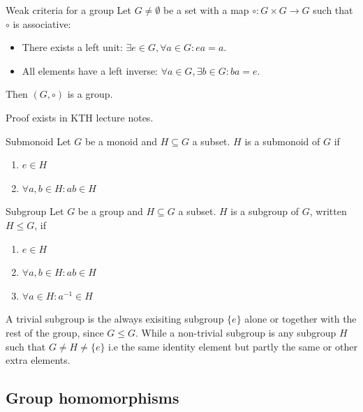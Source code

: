 \documentclass[a4paper]{article}
\begin{document}
\begin{ther}{Weak criteria for a group}
Let $G \neq \emptyset$ be a set with a map $\circ : G \times G \to G$ such that $\circ$ is associative:
\begin{itemize}
    \item There exists a left unit: $\exists e \in G, \forall a \in G : ea = a$.
    \item All elements have a left inverse: $\forall a \in G, \exists b \in G : ba = e$.
\end{itemize}
Then $(G, \circ)$ is a group.
\end{ther}
\begin{add}
    Proof exists in KTH lecture notes.
\end{add}

\begin{defi}{Submonoid}
Let $G$ be a monoid and $H \subseteq G$ a subset. $H$ is a submonoid of $G$ if 
\begin{enumerate}[label=(\roman*)]
    \item $e \in H$
    \item $\forall a,b \in H : ab \in H$
\end{enumerate}
\end{defi}

\begin{defi}{Subgroup}
Let $G$ be a group and $H \subseteq G$ a subset. $H$ is a subgroup of $G$, written $H \le G$, if 
\begin{enumerate}[label=(\roman*)]
    \item $e \in H$ 
    \item $\forall a,b \in H : ab \in H$ 
    \item $\forall a \in H : a^{-1} \in H$ 
\end{enumerate}
\end{defi}
\begin{add}
    A trivial subgroup is the always exisiting subgroup $\{e\}$ alone or together with the rest of the group, since $G\leq G$. While a non-trivial subgroup is any subgroup $H$ such that $G\neq H \neq \{e\}$ i.e the same identity element but partly the same or other extra elements.
\end{add}

\subsection{Group homomorphisms}
\end{document}
